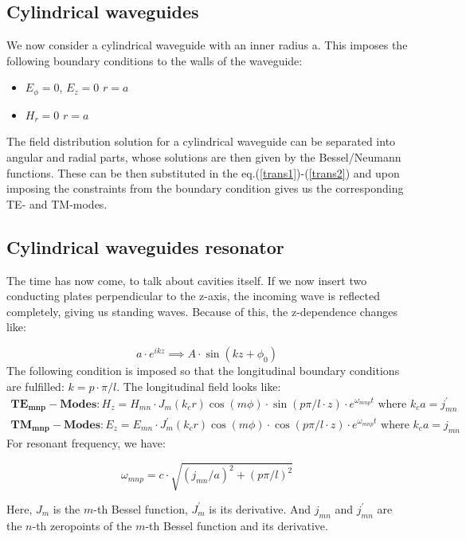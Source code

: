 \documentclass[a4paper]{article}
\numberwithin{equation}{section}
\begin{document}
\subsection{Cylindrical waveguides}
We now consider a cylindrical waveguide with an inner radius a. This imposes the following boundary conditions to the walls of the waveguide:
\begin{itemize}
		\item $E_{\phi} = 0$, $E_{z} = 0 $  $r = a$ 
		\item $H_{r} = 0 $  $r = a$ 
\end{itemize}

The field distribution solution for a cylindrical waveguide can be separated into angular and radial parts, whose solutions are then given by the Bessel/Neumann functions. These can be then substituted in the eq.(\ref{trans1})-(\ref{trans2}) and upon imposing the constraints from the boundary condition gives us the corresponding TE- and TM-modes.

\subsection{Cylindrical waveguides resonator}
The time has now come, to talk about cavities itself. If we now insert two conducting plates perpendicular to the z-axis, the incoming wave is reflected completely, giving us standing waves. Because of this, the z-dependence changes like: 

\[
		a \cdot e^{ikz} \implies A \cdot \sin\left(kz + \phi_{0}\right)    
\]
The following condition is imposed so that the longitudinal boundary conditions are fulfilled: $k = p\cdot \pi /l $. The longitudinal field looks like: 
\begin{align*}
		\mathbf{TE_{mnp}-Modes}: H_{z} = H_{mn}\cdot J_{m} \left(k_{c}r \right) \cos\left(m \phi \right) \cdot \sin\left(p \pi / l \cdot z \right) \cdot e^{\omega_{mnp}t} \text{ where } k_{c}a=j_{mn}^{'}  \\
		\mathbf{TM_{mnp}-Modes}: E_{z} = E_{mn}\cdot J_{m}^{'}  \left(k_{c}r \right) \cos\left(m \phi \right) \cdot \cos\left(p \pi / l \cdot z \right) \cdot e^{\omega_{mnp}t} \text{ where } k_{c}a=j_{mn} 
\end{align*}
For resonant frequency, we have:

\[
		\omega_{mnp} = c \cdot \sqrt{\left(j_{mn}/a\right)^2 + \left(p \pi / l\right)^2} 
\]

Here, $J_{m}$ is the $m$-th Bessel function, $J_{m}^{'} $ is its derivative. And $j_{mn}$ and $j_{mn}^{'}$ are the $n$-th zeropoints of the $m$-th Bessel function and its derivative.
\end{document}
